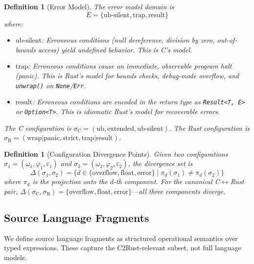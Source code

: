 \documentclass[11pt]{article}
\newtheorem{definition}[theorem]{Definition}
\newcommand{\SemConfig}{\sigma}
\newcommand{\SemConfigC}{\sigma_{\mathrm{C}}}
\newcommand{\SemConfigR}{\sigma_{\mathrm{R}}}
\begin{document}
\begin{definition}[Error Model]
\label{def:errormodel}
The error model domain is
\[
  E = \{ \mathrm{ub\text{-}silent}, \mathrm{trap}, \mathrm{result} \}
\]
where:
\begin{itemize}[leftmargin=*]
  \item $\mathrm{ub\text{-}silent}$: Erroneous conditions (null dereference, division by zero, out-of-bounds access) yield undefined behavior. This is C's model.
  \item $\mathrm{trap}$: Erroneous conditions cause an immediate, observable program halt (panic). This is Rust's model for bounds checks, debug-mode overflow, and \texttt{unwrap()} on \texttt{None}/\texttt{Err}.
  \item $\mathrm{result}$: Erroneous conditions are encoded in the return type as \texttt{Result<T, E>} or \texttt{Option<T>}. This is idiomatic Rust's model for recoverable errors.
\end{itemize}
The C configuration is $\SemConfigC = (\mathrm{ub}, \mathrm{extended}, \mathrm{ub\text{-}silent})$. The Rust configuration is $\SemConfigR = (\mathrm{wrap}|\mathrm{panic}, \mathrm{strict}, \mathrm{trap}|\mathrm{result})$.
\end{definition}

\begin{definition}[Configuration Divergence Points]
\label{def:divpoints}
Given two configurations $\SemConfig_1 = (\omega_1, \varphi_1, \varepsilon_1)$ and $\SemConfig_2 = (\omega_2, \varphi_2, \varepsilon_2)$, the \emph{divergence set} is
\[
  \Delta(\SemConfig_1, \SemConfig_2) = \{ d \in \{\mathrm{overflow}, \mathrm{float}, \mathrm{error}\} \mid \pi_d(\SemConfig_1) \neq \pi_d(\SemConfig_2) \}
\]
where $\pi_d$ is the projection onto the $d$-th component. For the canonical C$\leftrightarrow$Rust pair, $\Delta(\SemConfigC, \SemConfigR) = \{\mathrm{overflow}, \mathrm{float}, \mathrm{error}\}$---all three components diverge.
\end{definition}


\subsection{Source Language Fragments}
\label{sec:sourcelang}

We define source language fragments as structured operational semantics over typed expressions. These capture the C2Rust-relevant subset, not full language models.
\end{document}
